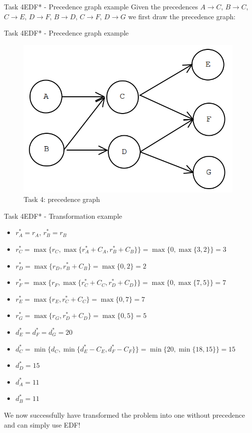\begin{frame}{Task 4}{EDF* - Precedence graph example}
Given the precedences $A \rightarrow C$, $B \rightarrow C$, $C \rightarrow E$, $D \rightarrow F$, $B \rightarrow D$, $C \rightarrow F$, $D \rightarrow G$ we first draw the precedence graph:
\end{frame}

\begin{frame}{Task 4}{EDF* - Precedence graph example}
\begin{figure}
    \centering
    \includegraphics[scale=0.4]{figures/precedencegraph}
    \caption{Task 4: precedence graph}
    \label{pregraph}
\end{figure}
\end{frame}

\begin{frame}[allowframebreaks]{Task 4}{EDF* - Transformation example}
    \begin{itemize}
        \item $r_A^* = r_A$, $r_B^* = r_B$
        \item $r_C^* = \max\{r_C,\max\{r_A^* + C_A, r_B^* + C_B\}\} = \max\{0, \max\{3, 2\}\} = 3$
        \item $r_D^* = \max\{r_D,r_B^* + C_B\} = \max\{0, 2\} = 2$
        \item $r_F^* = \max\{r_F,\max\{r_C^* + C_C, r_D^* + C_D\}\} = \max\{0, \max\{7, 5\}\} = 7$
        \item $r_E^* = \max\{r_E,r_C^* + C_C\} = \max\{0, 7\} = 7$
        \item $r_G^* = \max\{r_G,r_D^* + C_D\} = \max\{0, 5\} = 5$
    \end{itemize}
    \framebreak
    \begin{itemize}
        \item $d_E^* = d_F^* = d_G^* = 20$
        \item $d_C^* = \min\{d_C, \min\{d_E^* - C_E, d_F^* - C_F\}\} = \min\{20, \min\{18, 15\}\} = 15$
        \item $d_D^* = 15$
        \item $d_A^* = 11$
        \item $d_B^* = 11$
    \end{itemize}
    We now successfully have transformed the problem into one without precedence and can simply use EDF!
\end{frame}

